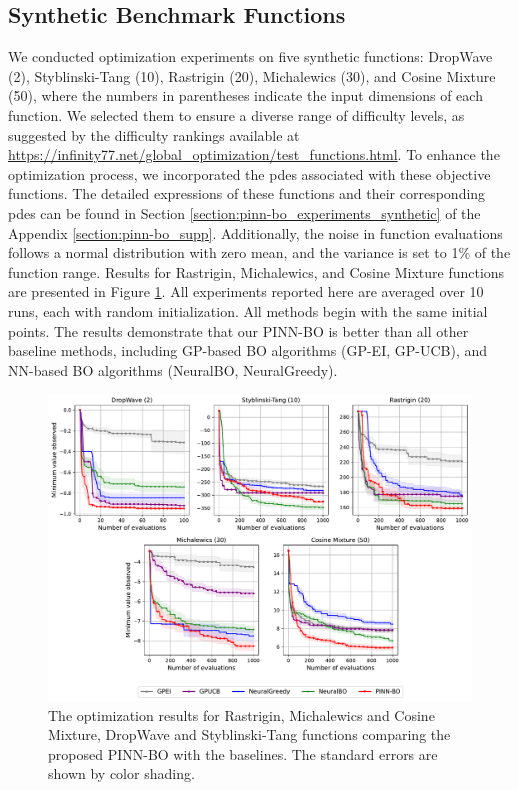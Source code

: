 \subsection{Synthetic Benchmark Functions}
 We conducted optimization experiments on five synthetic functions: DropWave (2), Styblinski-Tang (10), Rastrigin (20), Michalewics (30), and Cosine Mixture (50), where the numbers in parentheses indicate the input dimensions of each function. We selected them to ensure a diverse range of difficulty levels, as suggested by the difficulty rankings available at \url{https://infinity77.net/global_optimization/test_functions.html}. To enhance the optimization process, we incorporated the \acp{pde} associated with these objective functions. The detailed expressions of these functions and their corresponding \acp{pde} can be found in  Section \ref{section:pinn-bo_experiments_synthetic}  of the  Appendix \ref{section:pinn-bo_supp}. Additionally, the noise in function evaluations follows a normal distribution with zero mean, and the variance is set to 1\% of the function range. Results for Rastrigin, Michalewics, and Cosine Mixture functions are presented in Figure \ref{fig:pinn-bo_synthetic}.
All experiments reported here are averaged over 10 runs, each with random initialization. All methods begin with the same initial points. The results demonstrate that our PINN-BO is better than all other baseline methods, including GP-based BO algorithms (GP-EI, GP-UCB), and NN-based BO algorithms (NeuralBO, NeuralGreedy). 




\begin{figure}[ht] %
  \centering
  \includegraphics[width=\textwidth]{Figures/PINN-BO/pinn-bo_all_synthetic.pdf} 
  \caption{The optimization results for Rastrigin, Michalewics and Cosine Mixture, DropWave and Styblinski-Tang functions comparing the proposed PINN-BO with the baselines. The standard errors are shown by color shading.}
  \label{fig:pinn-bo_synthetic}
\end{figure}


